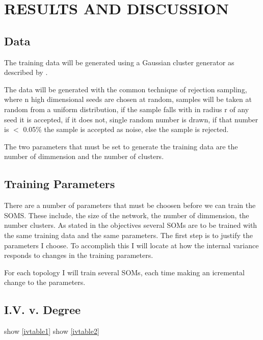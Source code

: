 \chapter{RESULTS AND DISCUSSION}
\section{Data}
The training data will be generated using a Gaussian cluster generator as
described by \citep{handl}.

The data will be generated with the common technique of rejection sampling,
where n high dimensional seeds are chosen at random, samples will be taken
at random from a uniform distribution, if the sample falls with in radius r of
any seed it is accepted, if it does not, single random number is drawn, if that
number is \(<\) 0.05\% the sample is accepted as noise, else the sample is rejected.

The two parameters that must be set to generate the training data are the
number of dimmension and the number of clusters.

\section{Training Parameters}
There are a number of parameters that must be choosen before we can train the
SOMS.  These include, the size of the network, the number of dimmension, the
number clusters.
As stated in the objectives several SOMs are to be trained with the same
training data and the same parameters.  The first step is to justify the
parameters I choose.  To accomplish this I will locate at how the internal
variance responds to changes in the training parameters.

For each topology I will train several SOMs, each time making an icremental
change to the parameters.


\section{I.V. v. Degree}


show \ref{ivtable1}
show \ref{ivtable2}

